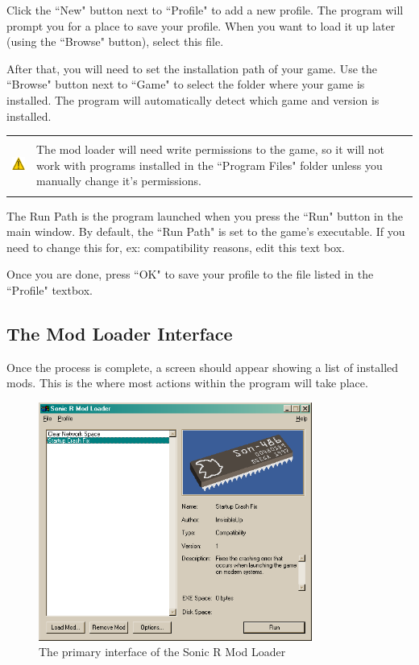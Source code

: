 \documentclass[12pt,a4paper,notitlepage]{article}
\newcommand{\warning}[1]{
    \begin{tabular}{m{1.1cm}  m{11cm}}
    &\\
    \includegraphics[width=1.1cm, height=1.1cm]{warning} & #1
    \\&\\
    \end{tabular}
}
\begin{document}
Click the ``New" button next to ``Profile" to add a new profile. The program will prompt you for a place to save your profile. When you want to load it up later (using the ``Browse" button), select this file.

After that, you will need to set the installation path of your game. Use the ``Browse" button next to ``Game" to select the folder where your game is installed. The program will automatically detect which game and version is installed.

\warning{The mod loader will need write permissions to the game, so it will not work with programs installed in the ``Program Files" folder unless you manually change it's permissions.}

The Run Path is the program launched when you press the ``Run" button in the main window. By default, the ``Run Path" is set to the game's executable.  If you need to change this for, ex: compatibility reasons, edit this text box.

Once you are done, press ``OK" to save your profile to the file listed in the ``Profile" textbox.

\subsection{The Mod Loader Interface}
\label{subsec:using-interface}
Once the process is complete, a screen should appear showing a list of installed mods. This is the where most actions within the program will take place.

\begin{figure}[h]
    \centering
    \includegraphics[width=0.8\textwidth]{interface-3.png}
    \caption{The primary interface of the Sonic R Mod Loader}
    \label{fig:interface}
\end{figure}
\end{document}
